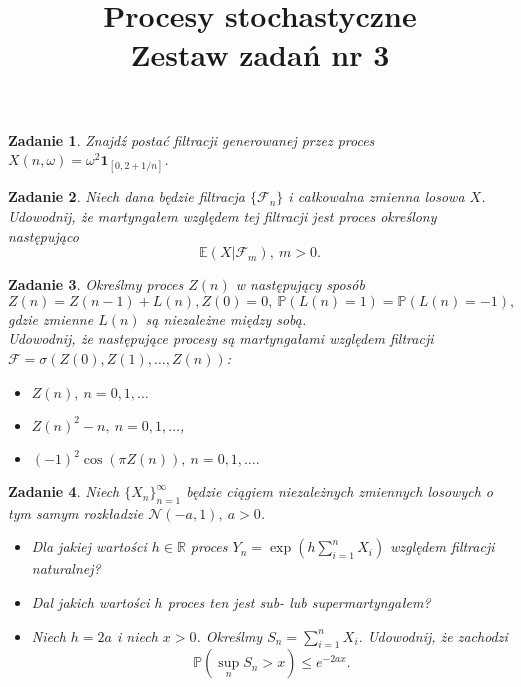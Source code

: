 \documentclass{mwart}
\title{Procesy stochastyczne\\ Zestaw zadań nr 3}
\newtheorem{zd}{Zadanie}
\begin{document}

\maketitle

\begin{zd}
Znajdź postać filtracji generowanej przez proces $X(n, \omega) = \omega^2\pmb{1}_{[0, 2+1/n]}$.
\end{zd}

\begin{zd}
Niech dana będzie filtracja $\{\mathcal{F}_n\}$ i całkowalna zmienna losowa $X$. Udowodnij, że martyngałem względem tej filtracji jest proces określony
następująco
\begin{displaymath}
\mathbb{E}\left(X|\mathcal{F}_m\right),\ m>0.
\end{displaymath}
\end{zd}

\begin{zd}
	Określmy proces $Z(n)$ w następujący sposób
	\begin{displaymath}
		Z(n) = Z(n-1) + L(n), Z(0) = 0,\  \mathbb{P}(L(n) = 1)  = \mathbb{P}(L(n) = -1),
	\end{displaymath}
	gdzie zmienne $L(n)$ są niezależne między sobą.\\
	Udowodnij, że następujące procesy są martyngałami względem filtracji $\mathcal{F} = \sigma\left(Z(0), Z(1), \dots, Z(n)\right)$:
	\begin{itemize}
		\item $Z(n), \ n= 0, 1, \dots$
		\item $Z(n)^2 - n, \ n= 0, 1, \dots$,
		\item $ (-1)^2\cos \left(\pi Z(n)\right), \ n= 0, 1, \dots.$
	\end{itemize}
\end{zd}

\begin{zd}
Niech $\{X_n\}_{n=1}^{\infty}$ będzie ciągiem niezależnych zmiennych losowych o tym samym rozkładzie $\mathcal{N}\left(-a, 1\right),\ a >0$.
\begin{itemize}
\item Dla jakiej wartości $h\in \mathbb{R}$ proces $Y_n = \exp \left(h\sum_{i = 1}^nX_i\right)$ względem filtracji naturalnej?
\item Dal jakich wartości $h$ proces ten jest sub- lub supermartyngałem?
\item Niech $h=2a$ i niech $x > 0$. Określmy $S_n = \sum_{i=1}^nX_i$. Udowodnij, że zachodzi
\begin{displaymath}
\mathbb{P}\left(\sup_nS_n > x\right) \leq e^{-2ax}.
\end{displaymath}
\end{itemize}
\end{zd}
\end{document}
